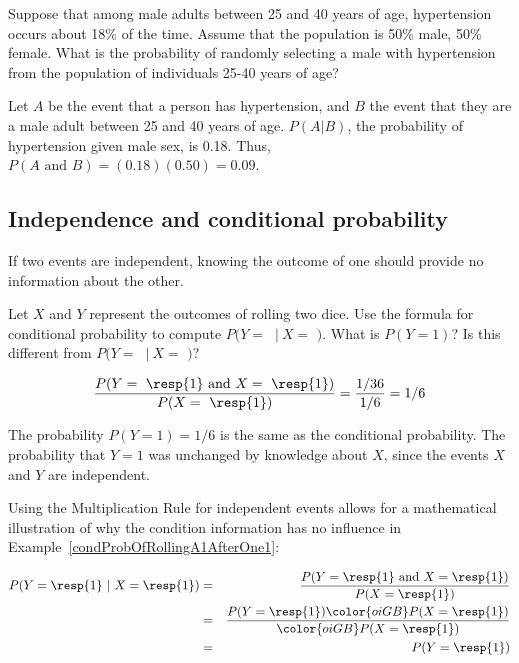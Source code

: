 \begin{example}
	{Suppose that among male adults between 25 and 40 years of age, hypertension occurs about 18\% of the time. Assume that the population is 50\% male, 50\% female. What is the probability of randomly selecting a male with hypertension from the population of individuals 25-40 years of age?} 
	
	Let $A$ be the event that a person has hypertension, and $B$ the event that they are a male adult between 25 and 40 years of age. $P(A|B)$, the probability of hypertension given male sex, is 0.18. Thus, $P(A \text{ and } B) = (0.18)(0.50) = 0.09$.
	
\end{example}


\subsection{Independence and conditional probability}

If two events are independent, knowing the outcome of one should provide no information about the other.  
\begin{example}
{Let $X$ and $Y$ represent the outcomes of rolling two dice. Use the formula for conditional probability to compute $P(Y =$ $\ |\ X = $ $)$. What is $P(Y=1)$? Is this different from $P(Y =$ $\ |\ X = $ $)$?}

\[\frac{P(Y = \text{ \resp{1} and }X=\text{ \resp{1}})}{P(X=\text{ \resp{1}})} = \frac{1/36}{1/6} = 1/6\]

The probability $P(Y=1) = 1/6$ is the same as the conditional probability. The probability that $Y=1$ was unchanged by knowledge about $X$, since the events $X$ and $Y$ are independent.

\label{condProbOfRollingA1AfterOne1}
\end{example}

Using the Multiplication Rule for independent events allows for a mathematical illustration of why the condition information has no influence in Example~\ref{condProbOfRollingA1AfterOne1}:

\begin{eqnarray*}
P(Y=\text{\resp{1}}\ |\ X=\text{\resp{1}})
	&=& \frac{P(Y=\text{\resp{1} and }X=\text{\resp{1}})}{P(X=\text{\resp{1}})} \\
	&=& \frac{P(Y=\text{\resp{1}}) \color{oiGB}P(X=\text{\resp{1}})}{\color{oiGB}P(X=\text{\resp{1}})} \\
	&=& P(Y=\text{\resp{1}}) \\
\end{eqnarray*}

